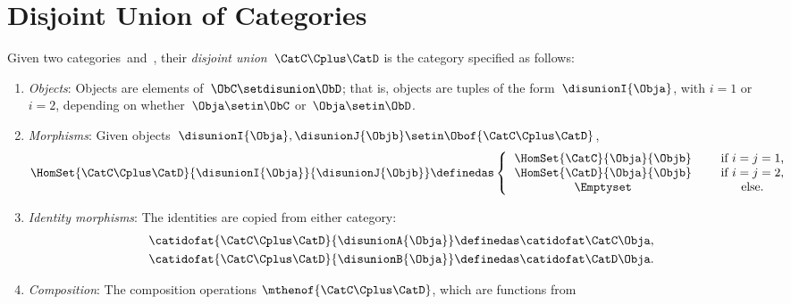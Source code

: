 
\section{Disjoint Union of Categories}

\begin{ctdefinition}
    \label{def:disjoint-union-category}
    Given two categories~\CatC and~\CatD, their \emph{disjoint union}~$\CatC\Cplus\CatD$ is the category specified as follows:
    \begin{enumerate}
        \item \emph{Objects}: Objects are elements of~$\ObC \setdisunion \ObD$; that is, objects are tuples of the form~$\disunionI{\Obja}$, with $i=1$ or $i=2$, depending on whether~$\Obja \setin \ObC$ or~$\Obja \setin \ObD$.
        \item \emph{Morphisms}: Given objects~$\disunionI{\Obja}, \disunionJ{\Objb} \setin \Obof{\CatC\Cplus\CatD}$,
              \begin{equation}
                  \HomSet{\CatC\Cplus\CatD}{\disunionI{\Obja}}{\disunionJ{\Objb}} \definedas
                  \left\{
                  \begin{tabular}{ccc}
                      $\HomSet{\CatC}{\Obja}{\Objb}$ &  & if $i=j = 1$, \\
                      $\HomSet{\CatD}{\Obja}{\Objb}$ &  & if $i = j =2$, \\
                      $\Emptyset$                    &  & else.
                  \end{tabular}
                  \right.{}
              \end{equation}
        \item \emph{Identity morphisms}: The identities  are copied from either category:
              \begin{align}
                  \catidofat{\CatC\Cplus\CatD}{\disunionA{\Obja}} & \definedas \catidofat\CatC\Obja, \\
                  \catidofat{\CatC\Cplus\CatD}{\disunionB{\Obja}} & \definedas \catidofat\CatD\Obja.
              \end{align}
        \item \emph{Composition}: The composition operations $\mthenof{\CatC\Cplus\CatD}$, which are functions from

\end{enumerate}
\end{ctdefinition}
